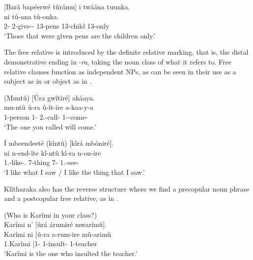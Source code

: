 \documentclass[output=paper]{langscibook}
\begin{document}
\z

\ea
\label{bkm:Ref132103834}
[Bará bapéerwé  tûrámu]  i  twáána  tuunka.\\
  ni  tû-ana  tû-onka.\\
{\db}2-\RM{} 2\SM{}-give-\PASS-\PFV{} 13-pens \COP{} 13-child  13-only\\
\glt
‘Those that were given pens are the children only.’

\z


The free relative is introduced by the definite relative marking, that is, the distal demonstrative ending in -\textit{ra}, taking the noun class of what it refers to. Free relative clauses function as independent NPs, as can be seen in their use as a subject as in  or object as in .

\ea
\label{bkm:Ref132114638}
(Muntû)  [Ûra  gwîtiré]  akáaya.\\
\gll
mu-ntû  û-ra  û-ît-ire  a-kaa-y-a\\
{\db}1-person  {\db}1-\RM{} 2\SG.\SM{}-call-\PFV{} 1\SM-\FUT{}-come-\FV{} \\
\glt
‘The one you called will come.’

\z

\ea
\label{bkm:Ref132114647}
\'{I} mbeendeeté  (kîntû)  [kîrá  mbóniré].\\
\gll
ni n-end-îte  kî-ntû  kî-ra  n-on-ire\\
\FOC{} 1\SG.\SM{}-like-\STAT{}.\PFV{}  {\db}7-thing  {\db}7-\RM{} 1\SG.\SM{}-see-\PFV{}\\
\glt
‘I like what I saw / I like the thing that I saw.’

\z


Kîîtharaka also has the reverse structure where we find a precopular noun phrase and a postcopular free relative, as in .

\ea
\label{bkm:Ref149295747}
(Who is Karîmi in your class?)\\
Karîmi n’ [ûrá árumiré mwarímû].\\
\gll
Karîmi  ni  [û-ra  a-rum-ire  mû-arimû\\
1.Karîmi \COP{} [1-\RM{}  1\SM{}-insult-\PFV{} 1-teacher\\
\glt
‘Karîmi is the one who insulted the teacher.’
\end{document}
